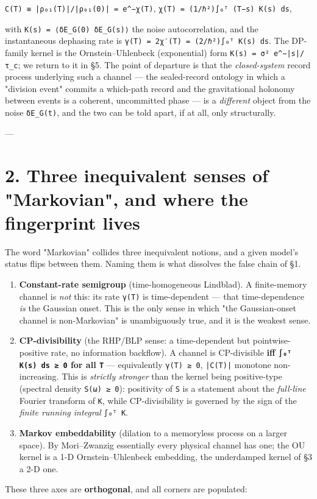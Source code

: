 \documentclass[11pt]{article}
\begin{document}
\texttt{C(T) ≡ |ρ₀₁(T)|/|ρ₀₁(0)| = e\textasciicircum{}{−χ(T)}},  \texttt{χ(T) = (1/ℏ²)∫₀ᵀ (T−s) K(s) ds},

with \texttt{K(s) = ⟨δE\_G(0) δE\_G(s)⟩} the noise autocorrelation, and the instantaneous dephasing rate is \texttt{γ(T) = 2χ′(T) = (2/ℏ²)∫₀ᵀ K(s) ds}. The DP-family kernel is the Ornstein–Uhlenbeck (exponential) form \texttt{K(s) = σ² e\textasciicircum{}{−|s|/τ\_c}}; we return to it in §5. The point of departure is that the \emph{closed-system} record process underlying such a channel — the sealed-record ontology in which a "division event" commits a which-path record and the gravitational holonomy between events is a coherent, uncommitted phase — is a \emph{different} object from the noise \texttt{δE\_G(t)}, and the two can be told apart, if at all, only structurally.

---

\section*{2. Three inequivalent senses of "Markovian", and where the fingerprint lives}
The word "Markovian" collides three inequivalent notions, and a given model's status flips between them. Naming them is what dissolves the false chain of §1.

\begin{enumerate}
\item \textbf{Constant-rate semigroup} (time-homogeneous Lindblad). A finite-memory channel is \emph{not} this: its rate \texttt{γ(T)} is time-dependent — that time-dependence \emph{is} the Gaussian onset. This is the only sense in which "the Gaussian-onset channel is non-Markovian" is unambiguously true, and it is the weakest sense.
\item \textbf{CP-divisibility} (the RHP/BLP sense: a time-dependent but pointwise-positive rate, no information backflow). A channel is CP-divisible \textbf{iff \texttt{∫₀ᵀ K(s) ds ≥ 0} for all \texttt{T}} — equivalently \texttt{γ(T) ≥ 0}, \texttt{|C(T)|} monotone non-increasing. This is \emph{strictly stronger} than the kernel being positive-type (spectral density \texttt{S(ω) ≥ 0}): positivity of \texttt{S} is a statement about the \emph{full-line} Fourier transform of \texttt{K}, while CP-divisibility is governed by the sign of the \emph{finite running integral} \texttt{∫₀ᵀ K}.
\item \textbf{Markov embeddability} (dilation to a memoryless process on a larger space). By Mori–Zwanzig essentially every physical channel has one; the OU kernel is a 1-D Ornstein–Uhlenbeck embedding, the underdamped kernel of §3 a 2-D one.
\end{enumerate}
These three axes are \textbf{orthogonal}, and all corners are populated:
\end{document}
